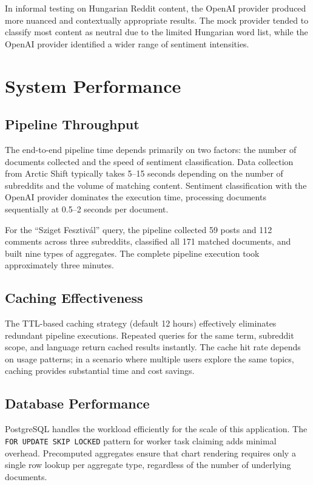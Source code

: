 In informal testing on Hungarian Reddit content, the OpenAI provider produced more nuanced and contextually appropriate results. The mock provider tended to classify most content as neutral due to the limited Hungarian word list, while the OpenAI provider identified a wider range of sentiment intensities.

\section{System Performance}
\label{sec:performance}

\subsection{Pipeline Throughput}

The end-to-end pipeline time depends primarily on two factors: the number of documents collected and the speed of sentiment classification. Data collection from Arctic Shift typically takes 5--15 seconds depending on the number of subreddits and the volume of matching content. Sentiment classification with the OpenAI provider dominates the execution time, processing documents sequentially at 0.5--2 seconds per document.

For the ``Sziget Fesztiv\'{a}l'' query, the pipeline collected 59 posts and 112 comments across three subreddits, classified all 171 matched documents, and built nine types of aggregates. The complete pipeline execution took approximately three minutes.

\subsection{Caching Effectiveness}

The TTL-based caching strategy (default 12 hours) effectively eliminates redundant pipeline executions. Repeated queries for the same term, subreddit scope, and language return cached results instantly. The cache hit rate depends on usage patterns; in a scenario where multiple users explore the same topics, caching provides substantial time and cost savings.

\subsection{Database Performance}

PostgreSQL handles the workload efficiently for the scale of this application. The \texttt{FOR UPDATE SKIP LOCKED} pattern for worker task claiming adds minimal overhead. Precomputed aggregates ensure that chart rendering requires only a single row lookup per aggregate type, regardless of the number of underlying documents.

